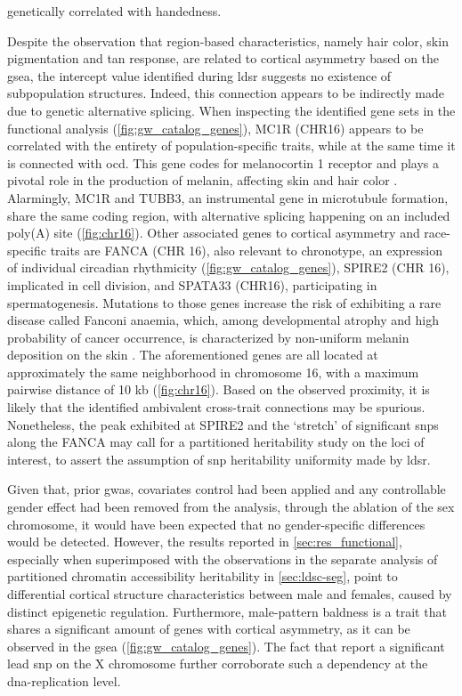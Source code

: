 genetically correlated with handedness.

Despite the observation that region-based characteristics, namely hair color, skin pigmentation and tan response, are related to cortical asymmetry based on the \ac{gsea}, the intercept value identified during \ac{ldsr} suggests no existence of subpopulation structures. Indeed, this connection appears to be indirectly made due to genetic alternative splicing. When inspecting the identified gene sets in the functional analysis (\autoref{fig:gw_catalog_genes}), MC1R (CHR16) appears to be correlated with the entirety of population-specific traits, while at the same time it is connected with \ac{ocd}. This gene codes for melanocortin 1 receptor and plays a pivotal role in the production of melanin, affecting skin and hair color \cite{Swope2018}. Alarmingly, MC1R and TUBB3, an instrumental gene in microtubule formation, share the same coding region, with alternative splicing happening on an included poly(A) site \cite{Dalziel2011}(\autoref{fig:chr16}). Other associated genes to cortical asymmetry and race-specific traits are FANCA (CHR 16), also relevant to chronotype, an expression of individual circadian rhythmicity \cite{Takahashi2018} (\autoref{fig:gw_catalog_genes}), SPIRE2 (CHR 16), implicated in cell division, and SPATA33 (CHR16), participating in spermatogenesis. Mutations to those genes increase the risk of exhibiting a rare disease called Fanconi anaemia, which, among developmental atrophy and high probability of cancer occurrence, is characterized by non-uniform melanin deposition on the skin \cite{Visconti2018}. The aforementioned genes are all located at approximately the same neighborhood in chromosome 16, with a maximum pairwise distance of 10 kb (\autoref{fig:chr16}). Based on the observed proximity, it is likely that the identified ambivalent cross-trait connections may be spurious. Nonetheless, the peak exhibited at SPIRE2 and the `stretch' of significant \acp{snp} along the FANCA may call for a partitioned heritability study on the loci of interest, to assert the assumption of \ac{snp} heritability uniformity made by \ac{ldsr}.

Given that, prior \ac{gwas}, covariates control had been applied and any controllable gender effect had been removed from the analysis, through the ablation of the sex chromosome, it would have been expected that no gender-specific differences would be detected. However, the results reported in \autoref{sec:res_functional}, especially when superimposed with the observations in the separate analysis of partitioned chromatin accessibility heritability in \autoref{sec:ldsc-seg}, point to differential cortical structure characteristics between male and females, caused by distinct epigenetic regulation. Furthermore, male-pattern baldness is a trait that shares a significant amount of genes with cortical asymmetry, as it can be observed in the \ac{gsea} (\autoref{fig:gw_catalog_genes}).  The fact that \citet{Sha2021} report a significant lead \ac{snp} on the X chromosome further corroborate such a dependency at the \ac{dna}-replication level.

